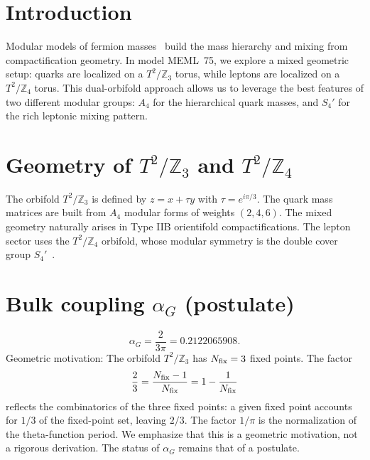 \documentclass[12pt,a4paper]{article}
\numberwithin{equation}{section}
\begin{document}
\section{Introduction}
Modular models of fermion masses~\cite{Feruglio2017,Kobayashi2019,Novichkov2019,Ding2021} build the mass hierarchy and mixing from compactification geometry. In model MEML~75, we explore a mixed geometric setup: quarks are localized on a \(T^2/\mathbb{Z}_3\) torus, while leptons are localized on a \(T^2/\mathbb{Z}_4\) torus. This dual-orbifold approach allows us to leverage the best features of two different modular groups: \(A_4\) for the hierarchical quark masses, and \(S_4'\) for the rich leptonic mixing pattern.

\section{Geometry of \(T^2/\mathbb{Z}_3\) and \(T^2/\mathbb{Z}_4\)}
The orbifold \(T^2/\mathbb{Z}_3\) is defined by \(z = x + \tau y\) with \(\tau = e^{i\pi/3}\). The quark mass matrices are built from \(A_4\) modular forms of weights \((2,4,6)\). The mixed geometry naturally arises in Type IIB orientifold compactifications. The lepton sector uses the \(T^2/\mathbb{Z}_4\) orbifold, whose modular symmetry is the double cover group \(S_4'\)~\cite{Novichkov2019,Ding2021}.

\section{Bulk coupling \(\alpha_G\) (postulate)}
\begin{equation}
\alpha_G = \frac{2}{3\pi} = 0.2122065908.
\end{equation}
Geometric motivation: The orbifold \(T^2/\mathbb{Z}_3\) has \(N_{\rm fix}=3\) fixed points. The factor
\begin{equation}
\frac{2}{3} = \frac{N_{\rm fix}-1}{N_{\rm fix}} = 1 - \frac{1}{N_{\rm fix}}
\end{equation}
reflects the combinatorics of the three fixed points: a given fixed point accounts for \(1/3\) of the fixed-point set, leaving \(2/3\). The factor \(1/\pi\) is the normalization of the theta-function period. We emphasize that this is a geometric motivation, not a rigorous derivation. The status of \(\alpha_G\) remains that of a postulate.
\end{document}
